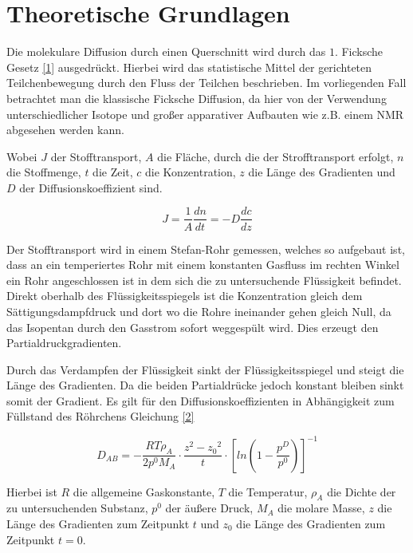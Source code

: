 



\section{Theoretische Grundlagen}

Die molekulare Diffusion durch einen Querschnitt wird durch das $1.$ Ficksche Gesetz \ref{1} ausgedrückt. Hierbei wird das  statistische Mittel der gerichteten Teilchenbewegung durch den Fluss der Teilchen beschrieben. Im vorliegenden Fall betrachtet man die klassische Ficksche Diffusion, da hier von der Verwendung unterschiedlicher Isotope und großer apparativer Aufbauten wie z.B. einem NMR abgesehen werden kann.


 Wobei $J$ der Stofftransport, $A$ die Fläche, durch die der Strofftransport erfolgt, $n$ die Stoffmenge, $t$ die Zeit, $c$ die Konzentration, $z$ die Länge des Gradienten und $D$ der Diffusionskoeffizient sind.

\begin {equation}
J=\frac{1}{A}\frac{dn}{dt}=-D\frac{dc}{dz}
\end {equation}



Der Stofftransport wird in einem Stefan-Rohr gemessen, welches so aufgebaut ist, dass an ein temperiertes Rohr mit einem konstanten Gasfluss im rechten Winkel ein Rohr angeschlossen ist in dem sich die zu untersuchende Flüssigkeit befindet. Direkt oberhalb des Flüssigkeitsspiegels ist die Konzentration gleich dem Sättigungsdampfdruck und dort wo die Rohre ineinander gehen gleich Null, da das Isopentan durch den Gasstrom sofort weggespült wird. Dies erzeugt den Partialdruckgradienten.

Durch das Verdampfen der Flüssigkeit sinkt der Flüssigkeitsspiegel und steigt die Länge des Gradienten. Da die beiden Partialdrücke jedoch konstant bleiben sinkt somit der Gradient.  Es gilt für den Diffusionskoeffizienten in Abhängigkeit zum Füllstand des Röhrchens Gleichung \ref{2}

\begin {equation}
D_{AB}=-\frac{RT\rho_A}{2p^0M_A}\cdot\frac{z^2-{z_0}^2}{t} \cdot\left[ln\left(1-\frac{p^D}{p^0}\right)\right]^{-1}
\end{equation}

Hierbei ist $R$ die allgemeine Gaskonstante, $T$ die Temperatur, $\rho_A$ die Dichte der zu untersuchenden Substanz, $p^0$ der äußere Druck, $M_A$ die molare Masse, $z$ die Länge des Gradienten zum Zeitpunkt $t$ und $z_0$ die Länge des Gradienten zum Zeitpunkt $t=0$. 

